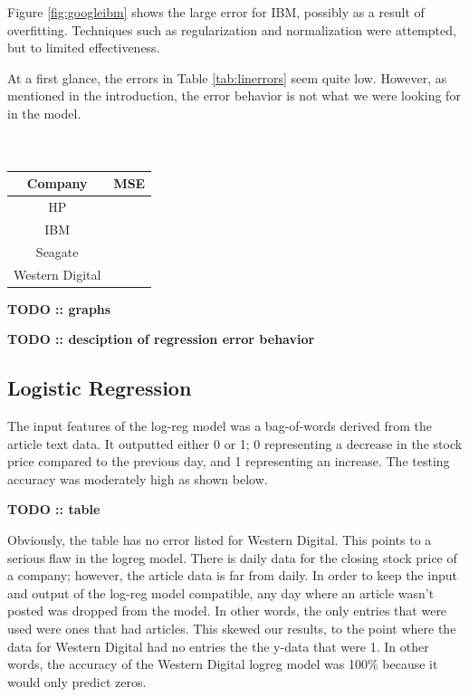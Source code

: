 \documentclass{article}
\begin{document}
Figure \ref{fig:googleibm} shows the large error for IBM, possibly as a result of overfitting. Techniques such as regularization and normalization were attempted, but to limited effectiveness. 

At a first glance, the errors in Table \ref{tab:linerrors} seem quite low. However, as mentioned in the introduction, the error behavior is not what we were looking for in the model. \\
\\
\\

{
 \centering
 \begin{tabular}{c | c}
 Company & MSE \\
 \hline
 HP & \\
 IBM & \\
 Seagate & \\
 Western Digital & \\
 \end{tabular}
 \label{tab:linerrors}
}



\textbf{TODO :: graphs}

\textbf{TODO :: desciption of regression error behavior}

\subsection{Logistic Regression}

The input features of the log-reg model was a bag-of-words derived from the article text data. It outputted either 0 or 1; 0 representing a decrease in the stock price compared to the previous day, and 1 representing an increase. The testing accuracy was moderately high as shown below. 

\textbf{TODO :: table}

Obviously, the table has no error listed for Western Digital. This points to a serious flaw in the logreg model. There is daily data for the closing stock price of a company; however, the article data is far from daily. In order to keep the input and output of the log-reg model compatible, any day where an article wasn't posted was dropped from the model. In other words, the only entries that were used were ones that had articles. This skewed our results, to the point where the data for Western Digital had no entries the the y-data that were 1. In other words, the accuracy of the Western Digital logreg model was 100\% because it would only predict zeros. 
\end{document}
